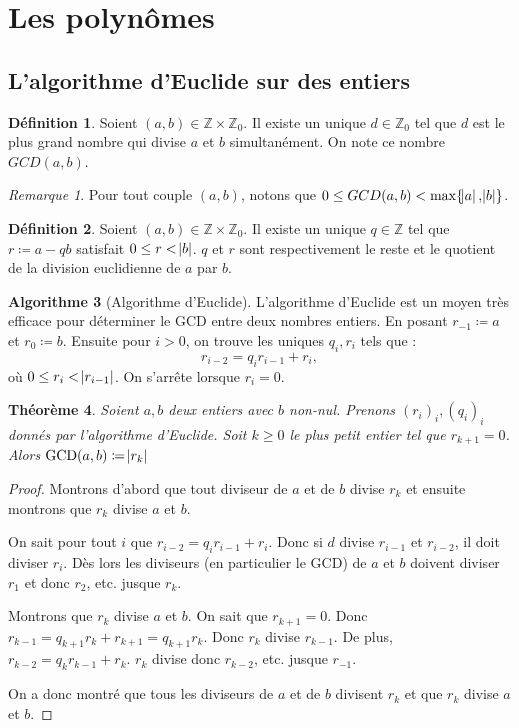 \documentclass{article}
\DeclareMathOperator{\GCD}{GCD}
\newcommand{\Z}{\mathbb Z}
\newtheorem{thm}{Théorème}[section]
\theoremstyle{definition}
\newtheorem{alg}[thm]{Algorithme}
\newtheorem{déf}[thm]{Définition}
\theoremstyle{remark}
\newtheorem*{rmq}{Remarque}
\begin{document}
\section{Les polynômes}
	\subsection{L'algorithme d'Euclide sur des entiers}
		\begin{déf} Soient $(a, b) \in \Z \times \Z_0$. Il existe un unique $d \in \Z_0$ tel que $d$ est le plus grand nombre qui divise $a$ et $b$ simultanément. On note
		ce nombre $GCD(a, b)$.\end{déf}

		\begin{rmq} Pour tout couple $(a, b)$, notons que $0 \leq GCD(a, b) < \max\{\abs a, \abs b\}$. \end{rmq}

		\begin{déf} Soient $(a, b) \in \Z \times \Z_0$. Il existe un unique $q \in \Z$ tel que $r \coloneqq a - qb$ satisfait $0 \leq r < \abs b$. $q$ et $r$ sont
		respectivement le reste et le quotient de la division euclidienne de $a$ par $b$. \end{déf}

		\begin{alg}[Algorithme d'Euclide]\label{algEuclide} L'algorithme d'Euclide est un moyen très efficace pour déterminer le GCD entre deux nombres entiers. En posant
		$r_{-1} \coloneqq a$ et $r_0 \coloneqq b$. Ensuite pour $i > 0$, on trouve les uniques $q_i, r_i$ tels que : \[r_{i-2} = q_ir_{i-1} + r_i,\] où
		$0 \leq r_i < \abs{r_{i-1}}$. On s'arrête lorsque $r_i = 0$. \end{alg}

		\begin{thm} Soient $a, b$ deux entiers avec $b$ non-nul. Prenons $(r_i)_i, (q_i)_i$ donnés par l'algorithme d'Euclide. Soit $k \geq 0$ le plus petit entier tel que
		$r_{k+1} = 0$. Alors $\GCD(a, b) \coloneqq \abs {r_k}$\end{thm}

		\begin{proof} Montrons d'abord que tout diviseur de $a$ et de $b$ divise $r_k$ et ensuite montrons que $r_k$ divise $a$ et $b$.

		On sait pour tout $i$ que $r_{i-2} = q_ir_{i-1} + r_i$. Donc si $d$ divise $r_{i-1}$ et $r_{i-2}$, il doit diviser $r_i$. Dès lors les diviseurs (en particulier le GCD)
		de $a$ et $b$ doivent diviser $r_1$ et donc $r_2$, etc. jusque $r_k$.

		Montrons que $r_k$ divise $a$ et $b$. On sait que $r_{k+1} = 0$. Donc $r_{k-1} = q_{k+1}r_k + r_{k+1} = q_{k+1}r_k$. Donc $r_k$ divise $r_{k-1}$. De plus,
		$r_{k-2} = q_kr_{k-1} + r_k$. $r_k$ divise donc $r_{k-2}$, etc. jusque $r_{-1}$.

		On a donc montré que tous les diviseurs de $a$ et de $b$ divisent $r_k$ et que $r_k$ divise $a$ et $b$. \end{proof}
\end{document}
